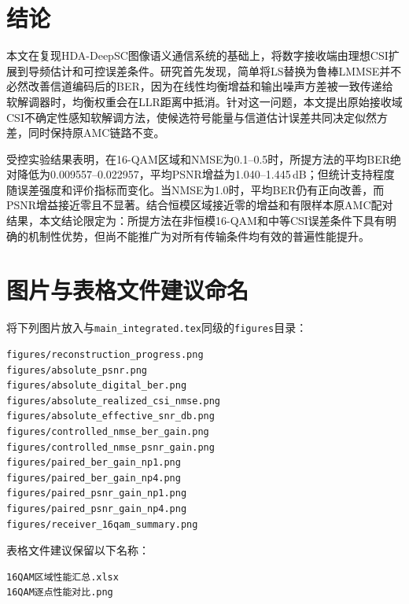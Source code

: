 \documentclass[UTF8,a4paper,11pt]{ctexart}
\newcommand{\HDADeepSC}{HDA-DeepSC}
\newcommand{\CSI}{CSI}
\newcommand{\AMC}{AMC}
\newcommand{\BER}{BER}
\newcommand{\PSNR}{PSNR}
\newcommand{\NMSE}{NMSE}
\newcommand{\LLR}{LLR}
\begin{document}
\section{结论}
本文在复现\HDADeepSC{}图像语义通信系统的基础上，将数字接收端由理想\CSI{}扩展到导频估计和可控误差条件。研究首先发现，简单将LS替换为鲁棒LMMSE并不必然改善信道编码后的\BER{}，因为在线性均衡增益和输出噪声方差被一致传递给软解调器时，均衡权重会在\LLR{}距离中抵消。针对这一问题，本文提出原始接收域\CSI{}不确定性感知软解调方法，使候选符号能量与信道估计误差共同决定似然方差，同时保持原\AMC{}链路不变。

受控实验结果表明，在16-QAM区域和\NMSE{}为0.1--0.5时，所提方法的平均\BER{}绝对降低为0.009557--0.022957，平均\PSNR{}增益为1.040--1.445\,dB；但统计支持程度随误差强度和评价指标而变化。当\NMSE{}为1.0时，平均\BER{}仍有正向改善，而\PSNR{}增益接近零且不显著。结合恒模区域接近零的增益和有限样本原\AMC{}配对结果，本文结论限定为：所提方法在非恒模16-QAM和中等\CSI{}误差条件下具有明确的机制性优势，但尚不能推广为对所有传输条件均有效的普遍性能提升。




\appendix
\section{图片与表格文件建议命名}
将下列图片放入与\texttt{main\_integrated.tex}同级的\texttt{figures}目录：
\begin{verbatim}
figures/reconstruction_progress.png
figures/absolute_psnr.png
figures/absolute_digital_ber.png
figures/absolute_realized_csi_nmse.png
figures/absolute_effective_snr_db.png
figures/controlled_nmse_ber_gain.png
figures/controlled_nmse_psnr_gain.png
figures/paired_ber_gain_np1.png
figures/paired_ber_gain_np4.png
figures/paired_psnr_gain_np1.png
figures/paired_psnr_gain_np4.png
figures/receiver_16qam_summary.png
\end{verbatim}

表格文件建议保留以下名称：
\begin{verbatim}
16QAM区域性能汇总.xlsx
16QAM逐点性能对比.png
\end{verbatim}
\end{document}
